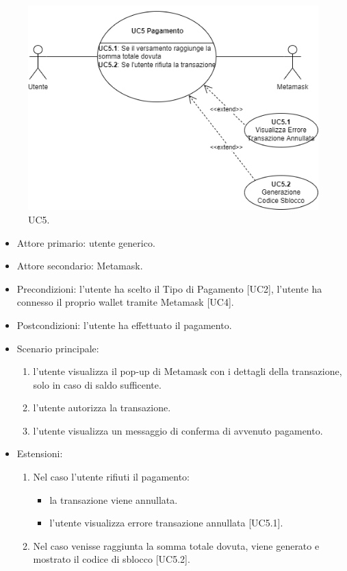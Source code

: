 \begin{figure}[H]
    \centering
    \includegraphics[scale=0.7]{immagini/UseCases-UC5.png}
    \caption{UC5.}
  \end{figure}

\begin{itemize}
    \item Attore primario: utente generico.
    \item Attore secondario: Metamask.
    \item Precondizioni: l'utente ha scelto il Tipo di Pagamento [UC2], l'utente ha connesso il proprio wallet tramite Metamask [UC4].
    \item Postcondizioni: l'utente ha effettuato il pagamento.
    \item Scenario principale: \begin{enumerate}
        \item l'utente visualizza il pop-up di Metamask con i dettagli della transazione, solo in caso di saldo sufficente.
        \item l'utente autorizza la transazione.
        \item l'utente visualizza un messaggio di conferma di avvenuto pagamento.
    \end{enumerate}
    \item Estensioni: \begin{enumerate}
        \item Nel caso l'utente rifiuti il pagamento: \begin{itemize}
            \item la transazione viene annullata.
            \item l'utente visualizza errore transazione annullata [UC5.1].
        \end{itemize}
        \item Nel caso venisse raggiunta la somma totale dovuta, viene generato e mostrato il codice di sblocco [UC5.2].
    \end{enumerate}
\end{itemize}

